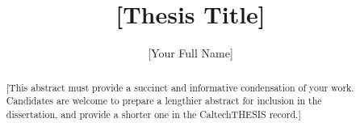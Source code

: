 \documentclass[12pt]{caltech_thesis}
\begin{document}
\title{[Thesis Title]}
\author{[Your Full Name]}

\address{Pasadena, California}                     %



\maketitle[logo]

\begin{acknowledgements} 	 
\end{acknowledgements}

\begin{abstract}
   [This abstract must provide a succinct and informative condensation of your work. Candidates are welcome to prepare a lengthier abstract for inclusion in the dissertation, and provide a shorter one in the CaltechTHESIS record.]
\end{abstract}

\begin{publishedcontent}%
\nocite{Cahn:etal:2015,Cahn:etal:2016}
\end{publishedcontent}
\end{document}
